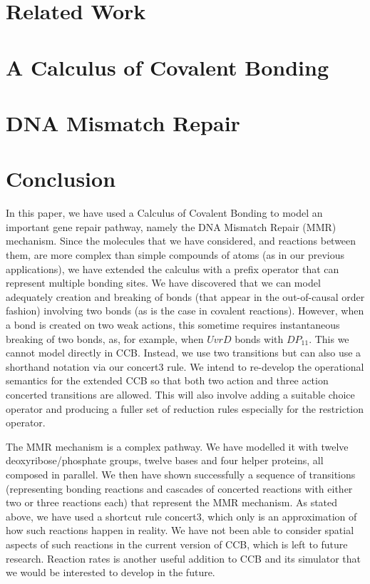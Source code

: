 \documentclass[review]{elsarticle}
\newcommand{\rulename}[1]{\textsf{#1}}
\newcommand{\DP}{\mathit{DP}}
\newcommand{\UvrD}{\mathit{UvrD}}
\begin{document}
\section{Related Work}

%
\section{A Calculus of Covalent Bonding}\label{sec:calculus}

%
%
%
\section{DNA Mismatch Repair}\label{sec:dnamimatch}

%
\section{Conclusion}

In this paper, we have used a Calculus of Covalent Bonding  to model an important gene repair pathway, namely the DNA Mismatch Repair (MMR) mechanism. Since the molecules that we have considered, and reactions between them, are more complex than simple compounds of atoms (as in our previous applications), we have extended the calculus with a prefix operator that can represent multiple bonding sites. We have discovered that we can model adequately creation and breaking of bonds (that appear in the out-of-causal order fashion) involving two bonds (as is the case in covalent reactions). However, when a bond is created on two weak actions, this sometime requires instantaneous breaking of two bonds, as, for example, when $\UvrD$ bonds with $\DP_{11}$. This we cannot model directly in CCB. Instead, we use two transitions but can also use a shorthand notation via our
\rulename{concert3} rule. We intend to re-develop the operational semantics for the extended CCB so that both two action 
and three action concerted transitions are allowed. This will also involve adding a suitable choice operator and 
producing a fuller set of reduction rules especially for the restriction operator.   


The MMR mechanism is a complex pathway. We have modelled it with twelve deoxyribose/phosphate groups, twelve bases and four helper proteins, all composed in parallel. We then have shown successfully a sequence of transitions (representing bonding reactions and cascades of concerted reactions with either two or three reactions each) that represent the MMR mechanism. As stated above, we have used a shortcut rule \rulename{concert3}, which only is an approximation of how such reactions happen in reality. We have not been able to consider spatial aspects of such reactions in the current version of CCB, which is left to future research. Reaction rates is another useful addition to CCB and its simulator that we would be interested to develop in the future. 


\end{document}

